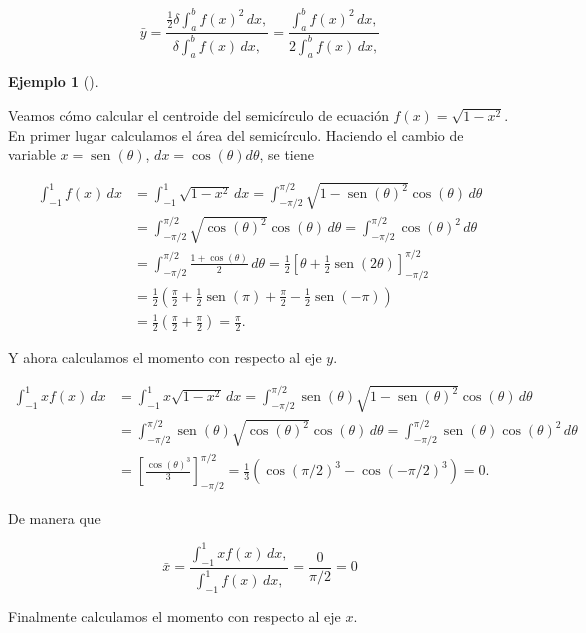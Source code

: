 \documentclass[
  a4paper,
]{scrreport}
\theoremstyle{plain}
\theoremstyle{definition}
\theoremstyle{plain}
\theoremstyle{plain}
\theoremstyle{definition}
\newtheorem{example}{Ejemplo}[chapter]
\theoremstyle{definition}
\theoremstyle{remark}
\begin{document}
\[
\bar y = \frac{\frac{1}{2}\delta \int_a^b f(x)^2\, dx,}{\delta \int_a^b f(x)\, dx,} = \frac{\int_a^b f(x)^2\, dx,}{2\int_a^b f(x)\, dx,}
\]

\begin{example}[]\protect\hypertarget{exm-centroide}{}\label{exm-centroide}

Veamos cómo calcular el centroide del semicírculo de ecuación
\(f(x)=\sqrt{1-x^2}\). En primer lugar calculamos el área del
semicírculo. Haciendo el cambio de variable
\(x=\operatorname{sen}(\theta)\), \(dx = \cos(\theta)d\theta\), se tiene

\begin{align*}
\int_{-1}^1 f(x)\,dx 
&= \int_{-1}^1 \sqrt{1-x^2}\,dx 
= \int_{-\pi/2}^{\pi/2} \sqrt{1-\operatorname{sen}(\theta)^2}\cos(\theta)\,d\theta \\
&= \int_{-\pi/2}^{\pi/2} \sqrt{\cos(\theta)^2}\cos(\theta)\,d\theta
= \int_{-\pi/2}^{\pi/2} \cos(\theta)^2\,d\theta \\
&= \int_{-\pi/2}^{\pi/2} \frac{1+\cos(\theta)}{2}\,d\theta
= \frac{1}{2}\left[\theta + \frac{1}{2}\operatorname{sen}(2\theta) \right]_{-\pi/2}^{\pi/2} \\
&= \frac{1}{2}\left(\frac{\pi}{2}+\frac{1}{2}\operatorname{sen}(\pi)+\frac{\pi}{2}-\frac{1}{2}\operatorname{sen}(-\pi)\right)\\
&= \frac{1}{2}\left(\frac{\pi}{2}+\frac{\pi}{2}\right)
= \frac{\pi}{2}.
\end{align*}

Y ahora calculamos el momento con respecto al eje \(y\).

\begin{align*}
\int_{-1}^1 xf(x)\,dx 
&= \int_{-1}^1 x\sqrt{1-x^2}\,dx 
= \int_{-\pi/2}^{\pi/2} \operatorname{sen}(\theta)\sqrt{1-\operatorname{sen}(\theta)^2}\cos(\theta)\,d\theta \\
&= \int_{-\pi/2}^{\pi/2} \operatorname{sen}(\theta)\sqrt{\cos(\theta)^2}\cos(\theta)\,d\theta
= \int_{-\pi/2}^{\pi/2} \operatorname{sen}(\theta)\cos(\theta)^2\,d\theta \\
&= \left[\frac{\cos(\theta)^3}{3} \right]_{-\pi/2}^{\pi/2} 
= \frac{1}{3}(\cos(\pi/2)^3-\cos(-\pi/2)^3)
= 0.
\end{align*}

De manera que

\[
\bar x = \frac{\int_{-1}^1 x f(x)\, dx,}{\int_{-1}^1 f(x)\, dx,} = \frac{0}{\pi/2} = 0
\]

Finalmente calculamos el momento con respecto al eje \(x\).


\end{example}
\end{document}
